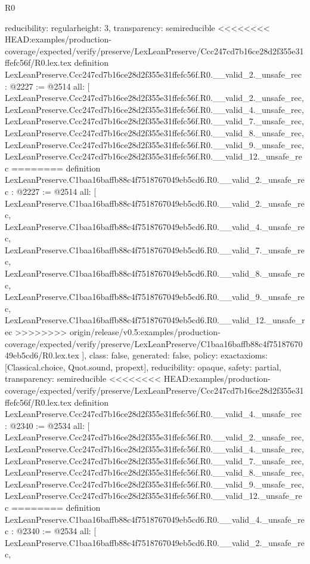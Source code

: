 \begin{lexlean}{R0}
\begin{coremodule}
{{{{{{{{{{{{{{{{{{{{{{{{{{{{{{{{{{{{{{{{{{{{{{{{{{  reducibility: regular{height: 3},
  transparency: semireducible
}
<<<<<<<< HEAD:examples/production-coverage/expected/verify/preserve/LexLeanPreserve/Ccc247cd7b16ce28d2f355e31ffefc56f/R0.lex.tex
definition LexLeanPreserve.Ccc247cd7b16ce28d2f355e31ffefc56f.R0.__valid_2._unsafe_rec : @2227 := @2514 {
  all: [
    LexLeanPreserve.Ccc247cd7b16ce28d2f355e31ffefc56f.R0.__valid_2._unsafe_rec,
    LexLeanPreserve.Ccc247cd7b16ce28d2f355e31ffefc56f.R0.__valid_4._unsafe_rec,
    LexLeanPreserve.Ccc247cd7b16ce28d2f355e31ffefc56f.R0.__valid_7._unsafe_rec,
    LexLeanPreserve.Ccc247cd7b16ce28d2f355e31ffefc56f.R0.__valid_8._unsafe_rec,
    LexLeanPreserve.Ccc247cd7b16ce28d2f355e31ffefc56f.R0.__valid_9._unsafe_rec,
    LexLeanPreserve.Ccc247cd7b16ce28d2f355e31ffefc56f.R0.__valid_12._unsafe_rec
========
definition LexLeanPreserve.C1baa16baffb88c4f7518767049eb5cd6.R0.__valid_2._unsafe_rec : @2227 := @2514 {
  all: [
    LexLeanPreserve.C1baa16baffb88c4f7518767049eb5cd6.R0.__valid_2._unsafe_rec,
    LexLeanPreserve.C1baa16baffb88c4f7518767049eb5cd6.R0.__valid_4._unsafe_rec,
    LexLeanPreserve.C1baa16baffb88c4f7518767049eb5cd6.R0.__valid_7._unsafe_rec,
    LexLeanPreserve.C1baa16baffb88c4f7518767049eb5cd6.R0.__valid_8._unsafe_rec,
    LexLeanPreserve.C1baa16baffb88c4f7518767049eb5cd6.R0.__valid_9._unsafe_rec,
    LexLeanPreserve.C1baa16baffb88c4f7518767049eb5cd6.R0.__valid_12._unsafe_rec
>>>>>>>> origin/release/v0.5:examples/production-coverage/expected/verify/preserve/LexLeanPreserve/C1baa16baffb88c4f7518767049eb5cd6/R0.lex.tex
  ],
  class: false,
  generated: false,
  policy: exact{axioms: [Classical.choice, Quot.sound, propext]},
  reducibility: opaque{},
  safety: partial,
  transparency: semireducible
}
<<<<<<<< HEAD:examples/production-coverage/expected/verify/preserve/LexLeanPreserve/Ccc247cd7b16ce28d2f355e31ffefc56f/R0.lex.tex
definition LexLeanPreserve.Ccc247cd7b16ce28d2f355e31ffefc56f.R0.__valid_4._unsafe_rec : @2340 := @2534 {
  all: [
    LexLeanPreserve.Ccc247cd7b16ce28d2f355e31ffefc56f.R0.__valid_2._unsafe_rec,
    LexLeanPreserve.Ccc247cd7b16ce28d2f355e31ffefc56f.R0.__valid_4._unsafe_rec,
    LexLeanPreserve.Ccc247cd7b16ce28d2f355e31ffefc56f.R0.__valid_7._unsafe_rec,
    LexLeanPreserve.Ccc247cd7b16ce28d2f355e31ffefc56f.R0.__valid_8._unsafe_rec,
    LexLeanPreserve.Ccc247cd7b16ce28d2f355e31ffefc56f.R0.__valid_9._unsafe_rec,
    LexLeanPreserve.Ccc247cd7b16ce28d2f355e31ffefc56f.R0.__valid_12._unsafe_rec
========
definition LexLeanPreserve.C1baa16baffb88c4f7518767049eb5cd6.R0.__valid_4._unsafe_rec : @2340 := @2534 {
  all: [
    LexLeanPreserve.C1baa16baffb88c4f7518767049eb5cd6.R0.__valid_2._unsafe_rec,
}}}}}}}}}}}}}}}}}}}}}}}}}}}}}}}}}}}}}}}}}}}}}}}}}}}}
\end{coremodule}
\end{lexlean}
